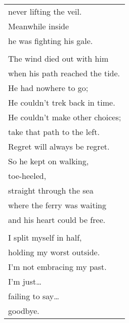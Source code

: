\documentclass{article}
\begin{document}
\begin{center}
\begin{tabular}{l}
never lifting the veil. \\
Meanwhile inside \\
he was fighting his gale. \\
\\
The wind died out with him \\
when his path reached the tide. \\
He had nowhere to go; \\
He couldn't trek back in time. \\
He couldn't make other choices; \\
take that path to the left. \\
Regret will always be regret. \\
So he kept on walking, \\
toe-heeled, \\
straight through the sea \\
where the ferry was waiting \\
and his heart could be free. \\
\\
I split myself in half, \\
holding my worst outside. \\
I'm not embracing my past. \\
I'm just\ldots \\
failing to say\ldots \\
goodbye. \\
\end{tabular}
\end{center}
\end{document}
